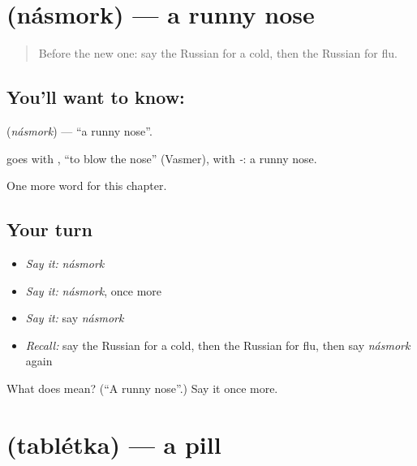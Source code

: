 \section[\texorpdfstring{\ru{насморк} (násmork)}{насморк (násmork)}]{ (násmork) — a runny nose}

\label{lesson:RU-C147-nasmork}



\begin{quote}
Before the new one: say the Russian for a cold, then the Russian for flu.
\end{quote}

\subsection*{You'll want to know: }
\textbf{} (\emph{násmork}) — \textquotedblleft{}a runny nose\textquotedblright{}.

\begin{cousinweb}
\textbf{} goes with \emph{}, \textquotedblleft{}to blow the nose\textquotedblright{} (Vasmer), with \emph{-}: a runny nose.
\end{cousinweb}

\begin{grammarlens}[title={What you've built}]
One more word for this chapter.
\end{grammarlens}

\subsection*{Your turn}
\begin{itemize}
\raggedright
  \item \emph{Say it:} \emph{násmork}
  \item \emph{Say it:} \emph{násmork}, once more
  \item \emph{Say it:} say \emph{násmork}
  \item \emph{Recall:} say the Russian for a cold, then the Russian for flu, then say \emph{násmork} again
\end{itemize}

\begin{tcolorbox}[breakable,colback=teal!4,colframe=teal!35!black,title={Before you move on}]
What does  mean? (\textquotedblleft{}A runny nose\textquotedblright{}.) Say it once more.
\end{tcolorbox}
\section[\texorpdfstring{\ru{таблетка} (tablétka)}{таблетка (tablétka)}]{ (tablétka) — a pill}

